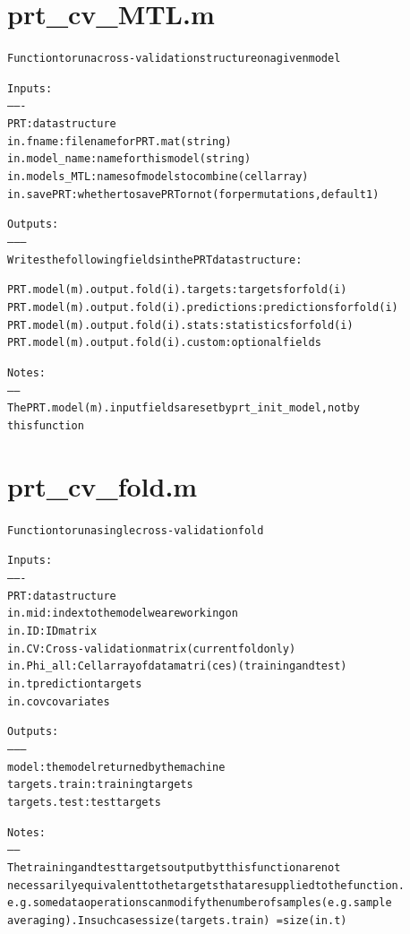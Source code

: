 \section{prt\_cv\_MTL.m}
\begin{alltt}

 Function to run a cross-validation structure on a given model
 
 Inputs:
 -------
 PRT:             data structure
 in.fname:        filename for PRT.mat (string)
 in.model\_name:   name for this model (string)
 in.models\_MTL:   names of models to combine (cell array)
 in.savePRT:      whether to save PRT or not (for permutations, default 1)
 
 Outputs:
 --------
 Writes the following fields in the PRT data structure:
 
 PRT.model(m).output.fold(i).targets:     targets for fold(i)
 PRT.model(m).output.fold(i).predictions: predictions for fold(i)
 PRT.model(m).output.fold(i).stats:       statistics for fold(i)
 PRT.model(m).output.fold(i).{custom}:    optional fields
 
 Notes:
 ------
 The PRT.model(m).input fields are set by prt\_init\_model, not by
 this function
 
\end{alltt}


\section{prt\_cv\_fold.m}
\begin{alltt}

 Function to run a single cross-validation fold 
 
 Inputs:
 -------
 PRT:           data structure
 in.mid:        index to the model we are working on
 in.ID:         ID matrix
 in.CV:         Cross-validation matrix (current fold only)
 in.Phi\_all:    Cell array of data matri(ces) (training and test)
 in.t           prediction targets
 in.cov         covariates 
 
 Outputs:
 --------
 model:         the model returned by the machine
 targets.train: training targets
 targets.test:  test targets
 
 Notes: 
 ------
 The training and test targets output byt this function are not
 necessarily equivalent to the targets that are supplied to the function.
 e.g. some data operations can modify the number of samples (e.g. sample
 averaging). In such cases size(targets.train) ~= size(in.t)
 
\end{alltt}


